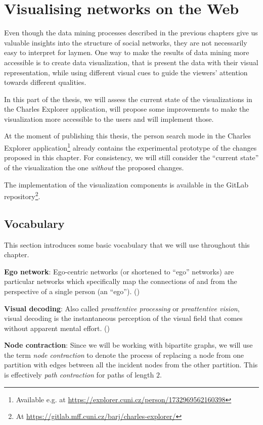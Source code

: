 \chapter{Visualising networks on the Web}

Even though the data mining processes described in the previous chapters give us valuable insights into the structure of social networks, 
they are not necessarily easy to interpret for laymen.
One way to make the results of data mining more accessible is to create data visualization, that is present the data with their visual representation, 
while using different visual cues to guide the viewers' attention towards different qualities.

In this part of the thesis, we will assess the current state of the visualizations in the Charles Explorer application, 
will propose some improvements to make the visualization more accessible to the users and will implement those.

At the moment of publishing this thesis, the person search mode in the Charles Explorer application\footnote{Available e.g. at \url{https://explorer.cuni.cz/person/1732969562160398}} already contains the experimental prototype of the changes proposed in this chapter.
For consistency, we will still consider the ``current state'' of the visualization the one \textit{without} the proposed changes.

The implementation of the visualization components is available in the GitLab repository\footnote{At \url{https://gitlab.mff.cuni.cz/barj/charles-explorer/}}.

\section{Vocabulary}

This section introduces some basic vocabulary that we will use throughout this chapter.

\textbf{Ego network}: Ego-centric networks (or shortened to “ego” networks) are particular networks which specifically map the connections of and from the perspective of a single person (an “ego”). (\cite{Lizardo2020-xo})

\textbf{Visual decoding}: Also called \textit{preattentive processing} or \textit{preattentive vision}, visual decoding is the instantaneous perception of the visual field that comes without apparent mental effort. (\cite{Cleveland1985})

\textbf{Node contraction}: Since we will be working with bipartite graphs, we will use the term \textit{node contraction} to denote the process of replacing a node from one partition with edges between all the incident nodes from the other partition.
This is effectively \textit{path contraction} for paths of length $2$.

